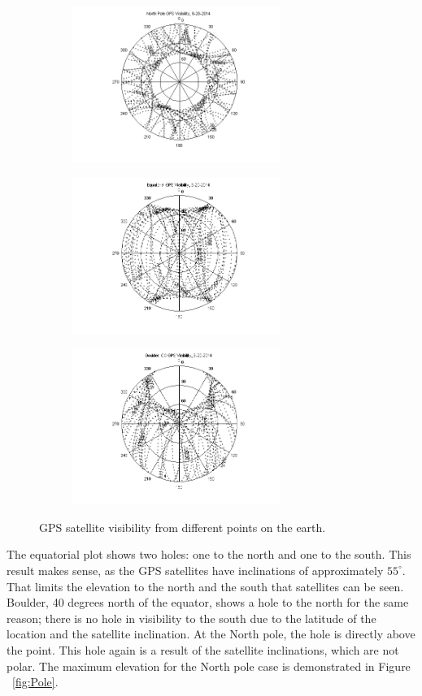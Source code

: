\documentclass[paper]{aiaaNew}
\begin{document}
\begin{figure}[H]
 	\centering
	\begin{subfigure}
	\centering
 		\includegraphics[height=2in]{Figures/PRN_Vis_NP_201409200000MDT_24hr}
	\end{subfigure}
	\begin{subfigure}
	\centering
 		\includegraphics[height=2in]{Figures/PRN_Vis_Equator_201409200000MDT_24hr}
	\end{subfigure}
	\begin{subfigure}
	\centering
 		\includegraphics[height=2in]{Figures/PRN_Vis_Boulder_201409200000MDT_24hr}
	\end{subfigure}
 	\caption{GPS satellite visibility from different points on the earth.}
 	\label{fig:3Coverage}
 \end{figure}

The equatorial plot shows two holes: one to the north and one to the south. This result makes sense, as the GPS satellites have inclinations of approximately $55^{\circ}$.  That limits the elevation to the north and the south that satellites can be seen.  Boulder, 40 degrees north of the equator, shows a hole to the north for the same reason; there is no hole in visibility to the south due to the latitude of the location and the satellite inclination.  At the North pole, the hole is directly above the point.  This hole again is a result of the satellite inclinations, which are not polar.  The maximum elevation for the North pole case is demonstrated in Figure ~\ref{fig:Pole}. 
\end{document}
